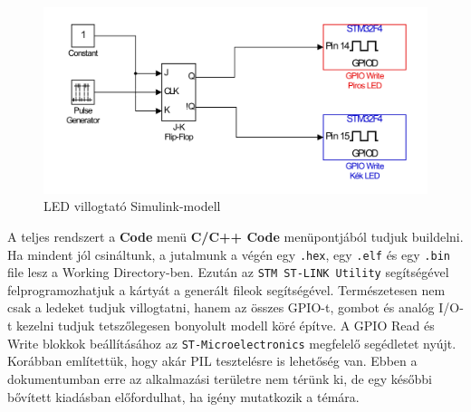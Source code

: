 \begin{figure}[!ht]
    \centering
    \includegraphics[width=0.9\linewidth]{img/stmblink}
    \caption{LED villogtató Simulink-modell}
    \label{fig:stmblink}
\end{figure}

A teljes rendszert a \textbf{Code} menü \textbf{C/C++ Code} menüpontjából tudjuk buildelni. Ha mindent jól csináltunk, a jutalmunk a végén egy \verb!.hex!, egy \verb!.elf! és egy \verb!.bin! file lesz a Working Directory-ben. Ezután az \texttt{STM ST-LINK Utility} segítségével felprogramozhatjuk a kártyát a generált fileok segítségével. Természetesen nem csak a ledeket tudjuk villogtatni, hanem az összes GPIO-t, gombot és analóg I/O-t kezelni tudjuk tetszőlegesen bonyolult modell köré építve. A GPIO Read és Write blokkok beállításához az \texttt{ST-Microelectronics} megfelelő segédletet nyújt\cite{usermanual}.
Korábban említettük, hogy akár PIL tesztelésre is lehetőség van. Ebben a dokumentumban erre az alkalmazási területre nem térünk ki, de egy későbbi bővített kiadásban előfordulhat, ha igény mutatkozik a témára.